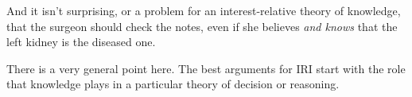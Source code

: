 \documentclass[11pt,oneside]{book}
\begin{document}
\noindent And it isn't surprising, or a problem for an interest-relative theory of knowledge, that the surgeon should check the notes, even if she believes \textit{and knows} that the left kidney is the diseased one.

There is a very general point here. The best arguments for IRI start with the role that knowledge plays in a particular theory of decision or reasoning. 




\end{document}
